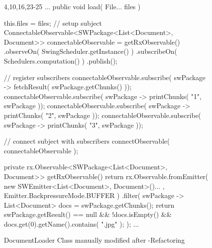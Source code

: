 \begin{figure}[H]
\begin{sourcecode}
\begin{javacode}{4,10,16,23-25}
...
	public void load( File... files ) {
		this.files = files;
		// setup subject
		ConnectableObservable<SWPackage<List<Document>, Document>> connectableObservable = getRxObservable()
				.observeOn( SwingScheduler.getInstance() )
				.subscribeOn( Schedulers.computation() )
				.publish();
				
		// register subscribers
		connectableObservable.subscribe( swPackage -> fetchResult( swPackage.getChunks() ));
		connectableObservable.subscribe( swPackage -> printChunks( "1", swPackage ));
		connectableObservable.subscribe( swPackage -> printChunks( "2", swPackage ));
		connectableObservable.subscribe( swPackage -> printChunks( "3", swPackage ));
		
		// connect subject with subscribers
		connectObservable( connectableObservable );
	}
	
	private rx.Observable<SWPackage<List<Document>, Document>> getRxObservable() {
		return rx.Observable.fromEmitter( new SWEmitter<List<Document>, Document>(){...
		}, Emitter.BackpressureMode.BUFFER )
				.filter( swPackage -> {
					List<Document> docs = swPackage.getChunks();
					return swPackage.getResult() == null && !docs.isEmpty() && docs.get(0).getName().contains( ".jpg" );
				} );
	}
...
\end{javacode}
\caption{DocumentLoader Class manually modified after \toolextension{}-Refactoring}
\label{code:example-edited}
\end{sourcecode}
\end{figure}
